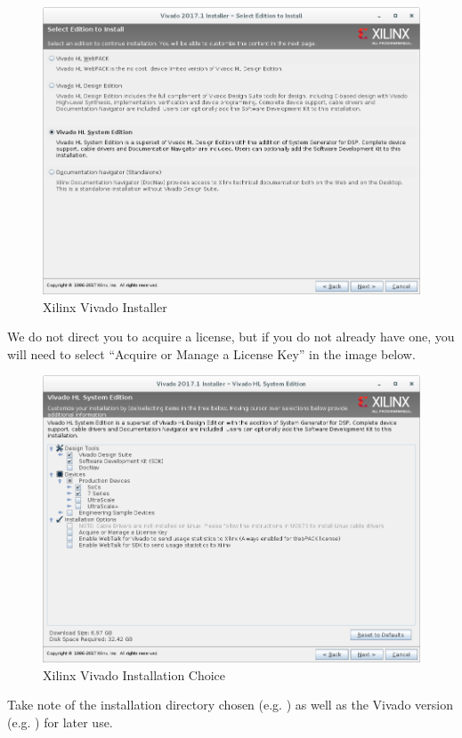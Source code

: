 \begin{flushleft}
\begin{flushleft}
\begin{enumerate}
\begin{figure}[H]
	\centerline{\includegraphics[scale=0.4]{figures/xilinx_vivado_2017_install}}
	\caption{Xilinx Vivado Installer}
\end{figure}
We do not direct you to acquire a license, but if you do not already have one, you will need to select ``Acquire or Manage a License Key'' in the image below.
\begin{figure}[H]
	\centerline{\includegraphics[scale=0.4]{figures/xilinx_vivado_2017_choose_installation}}
	\caption{Xilinx Vivado Installation Choice}
\end{figure}
\pagebreak
Take note of the installation directory chosen (e.g. ) as well as the Vivado version (e.g. ) for later use.

\end{enumerate}
\end{flushleft}
\end{flushleft}
